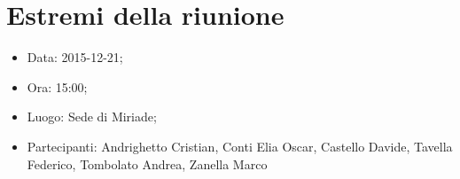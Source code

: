 \documentclass[../Riunione2015-12-21.tex]{subfiles}
\begin{document}
\section{Estremi della riunione}
	\begin{itemize}
		\item Data: 2015-12-21;
		\item Ora: 15:00;
		\item Luogo: Sede di Miriade;
		\item Partecipanti: Andrighetto Cristian, Conti Elia Oscar, Castello Davide, Tavella Federico, Tombolato Andrea, Zanella Marco
	\end{itemize}
\end{document}
